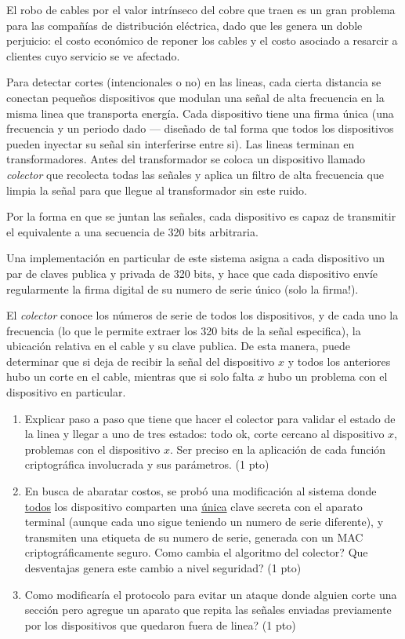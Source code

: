 \begin{consigna}
El robo de cables por el valor intrínseco del cobre que traen es un gran problema para las
compañías de distribución eléctrica, dado que les genera un doble perjuicio: el costo
económico de reponer los cables y el costo asociado a resarcir a clientes cuyo servicio se
ve afectado.

Para detectar cortes (intencionales o no) en las lineas, cada cierta distancia se conectan
pequeños dispositivos que modulan una señal de alta frecuencia en la misma linea que
transporta energía. Cada dispositivo tiene una firma única (una frecuencia y un periodo
dado --- diseñado de tal forma que todos los dispositivos pueden inyectar su señal sin
interferirse entre si). Las lineas terminan en transformadores. Antes del transformador se
coloca un dispositivo llamado \emph{colector} que recolecta todas las señales y aplica un
filtro de alta frecuencia que limpia la señal para que llegue al transformador sin este
ruido.

Por la forma en que se juntan las señales, cada dispositivo es capaz de transmitir el
equivalente a una secuencia de 320 bits arbitraria.

Una implementación en particular de este sistema asigna a cada dispositivo un par de claves
publica y privada de 320 bits, y hace que cada dispositivo envíe regularmente la firma
digital de su numero de serie único (solo la firma!).

El \emph{colector} conoce los números de serie de todos los dispositivos, y de cada uno la
frecuencia (lo que le permite extraer los 320 bits de la señal especifica), la ubicación
relativa en el cable y su clave publica. De esta manera, puede determinar que si deja de
recibir la señal del dispositivo $x$ y todos los anteriores hubo un corte en el cable,
mientras que si solo falta $x$ hubo un problema con el dispositivo en particular.

\begin{enumerate}
  \item[a)] Explicar paso a paso que tiene que hacer el colector para validar el estado de
  la linea y llegar a uno de tres estados: todo ok, corte cercano al dispositivo $x$,
  problemas con el dispositivo $x$. Ser preciso en la aplicación de cada función
  criptográfica involucrada y sus parámetros. (1 pto)
  \item[b)] En busca de abaratar costos, se probó una modificación al sistema donde
  \underline{todos} los dispositivo comparten una \underline{única} clave secreta con el
  aparato terminal (aunque cada uno sigue teniendo un numero de serie diferente), y
  transmiten una etiqueta de su numero de serie, generada con un MAC criptográficamente
  seguro. \textquestiondown{}Como cambia el algoritmo del colector? \textquestiondown{}Que desventajas genera este cambio a
  nivel seguridad? (1 pto)
  \item[b)] \textquestiondown{}Como modificaría el protocolo para evitar un ataque donde alguien corte una
  sección pero agregue un aparato que repita las señales enviadas previamente por los
  dispositivos que quedaron fuera de linea? (1 pto)
\end{enumerate}


\end{consigna}

